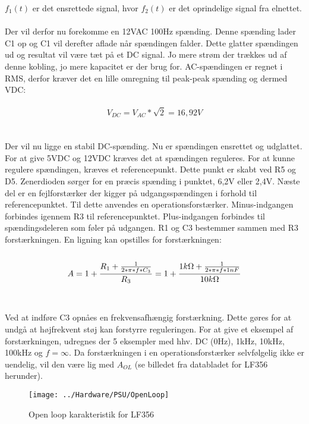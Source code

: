 $f_1(t)$ er det ensrettede signal, hvor $f_2(t)$ er det oprindelige signal fra elnettet.
\\\\
Der vil derfor nu forekomme en 12VAC 100Hz spænding. Denne spænding lader C1 op og C1 vil derefter aflade når spændingen falder.
Dette glatter spændingen ud og resultat vil være tæt på et DC signal. Jo mere strøm der trækkes ud af denne kobling, jo mere kapacitet er der brug for.
AC-spændingen er regnet i RMS, derfor kræver det en lille omregning til peak-peak spænding og dermed VDC:
\\\\
\begin{equation}
	V_{DC} = V_{AC} * \sqrt{2} = 16,92V
\end{equation}
\\\\
Der vil nu ligge en stabil DC-spænding. Nu er spændingen ensrettet og udglattet. For at give 5VDC og 12VDC kræves det at spændingen reguleres.
For at kunne regulere spændingen, kræves et referencepunkt. Dette punkt er skabt ved R5 og D5. Zenerdioden sørger for en præcis spænding
i punktet, 6,2V eller 2,4V. Næste del er en fejlforstærker der kigger på udgangsspændingen i forhold til referencepunktet.
Til dette anvendes en operationsforstærker. Minus-indgangen forbindes igennem R3 til referencepunktet. Plus-indgangen forbindes til
spændingsdeleren som føler på udgangen. R1 og C3 bestemmer sammen med R3 forstærkningen. En ligning kan opstilles for forstærkningen:
\\\\
\begin{equation}
	A = 1 + \frac{R_1 + \frac{1}{2*\pi*f*C_3}}{R_3} = 1 + \frac{1k\ohm + \frac{1}{2*\pi*f*1nF}}{10k\ohm}
\end{equation}
\\\\
Ved at indføre C3 opnåes en frekvensafhængig forstærkning. Dette gøres for at undgå at højfrekvent støj kan forstyrre reguleringen.
For at give et eksempel af forstærkningen, udregnes der 5 eksempler med hhv. DC (0Hz), 1kHz, 10kHz, 100kHz og $f = \infty$.
Da forstærkningen i en operationsforstærker selvfølgelig ikke er uendelig, vil den være lig med $A_{OL}$ (se billedet fra databladet for LF356 herunder).

\begin{figure}[H]
	\centering
	\texttt{[image: ../Hardware/PSU/OpenLoop]}
	\caption{Open loop karakteristik for LF356}
	\label{photo:OpenLoop}
\end{figure}


